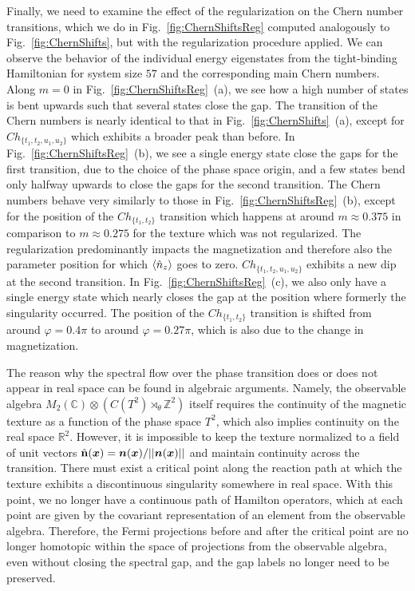 \documentclass[submission, Phys]{SciPost}
\begin{document}
Finally, we need to examine the effect of the regularization on the Chern number transitions, which we do in Fig.~\ref{fig:ChernShiftsReg} computed analogously to Fig.~\ref{fig:ChernShifts}, but with the regularization procedure applied. We can observe the behavior of the individual energy eigenstates from the tight-binding Hamiltonian for system size $57$ and the corresponding main Chern numbers.
Along $m=0$ in Fig.~\ref{fig:ChernShiftsReg}~(a), we see how a high number of states is bent upwards such that several states close the gap. The transition of the Chern numbers is nearly identical to that in Fig.~\ref{fig:ChernShifts}~(a), except for $Ch_{\lbrace t_1, t_2, u_1, u_2 \rbrace }$ which exhibits a broader peak than before.
In Fig.~\ref{fig:ChernShiftsReg}~(b), we see a single energy state close the gaps for the first transition, due to the choice of the phase space origin, and a few states bend only halfway upwards to close the gaps for the second transition. The Chern numbers behave very similarly to those in Fig.~\ref{fig:ChernShiftsReg}~(b), except for the position of the $Ch_{\lbrace t_1, t_2 \rbrace }$ transition which happens at around $m\approx0.375$ in comparison to $m\approx0.275$ for the texture which was not regularized. The regularization predominantly impacts the magnetization and therefore also the parameter position for which $\braket{\hat{n}_z}$ goes to zero.
$Ch_{\lbrace t_1, t_2, u_1, u_2 \rbrace }$ exhibits a new dip at the second transition.
In Fig.~\ref{fig:ChernShiftsReg}~(c), we also only have a single energy state which nearly closes the gap at the position where formerly the singularity occurred. The position of the $Ch_{\lbrace t_1, t_2 \rbrace }$ transition is shifted from around $\varphi=0.4\pi$ to around $\varphi=0.27\pi$, which is also due to the change in magnetization.

The reason why the spectral flow \cite{Doll2023} over the phase transition does or does not appear in real space can be found in algebraic arguments.
Namely, the observable algebra $M_2(\mathbb{C})\otimes(C(T^2)\rtimes_{\theta} \mathbb{Z}^2)$ itself requires the continuity of the magnetic texture as a function of the phase space $T^2$, which also implies continuity on the real space $\mathbb{R}^2$.
However, it is impossible to keep the texture normalized to a field of unit vectors $\hat{\mathbf{n}}(\boldsymbol{x})=\boldsymbol{n}(\boldsymbol{x})/||\boldsymbol{n}(\boldsymbol{x})||$ and maintain continuity across the transition.
There must exist a critical point along the reaction path at which the texture exhibits a discontinuous singularity somewhere in real space.
With this point, we no longer have a continuous path of Hamilton operators, which at each point are given by the covariant representation of an element from the observable algebra.
Therefore, the Fermi projections before and after the critical point are no longer homotopic within the space of projections from the observable algebra, even without closing the spectral gap, and the gap labels no longer need to be preserved.
\end{document}
